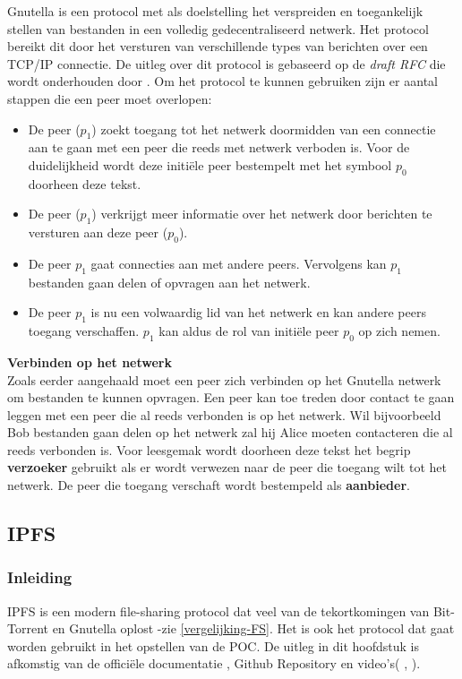 Gnutella is een protocol met als doelstelling het verspreiden en toegankelijk stellen van bestanden in een volledig gedecentraliseerd netwerk. Het protocol bereikt dit door het versturen van verschillende types van berichten over een TCP/IP connectie. De uitleg over dit protocol is gebaseerd op de \textit{draft RFC} die wordt onderhouden door \textcite{Klingberg2002}. Om het protocol te kunnen gebruiken zijn er aantal stappen die een peer moet overlopen:

\begin{itemize}
\item De peer ($p_1$) zoekt toegang tot het netwerk doormidden van een connectie aan te gaan met een peer die reeds met netwerk verboden is. Voor de duidelijkheid wordt deze initiële peer bestempelt met het symbool $p_0$ doorheen deze tekst.\\
\item De peer ($p_1$) verkrijgt meer informatie over het netwerk door berichten te versturen aan deze peer ($p_0$).\\
\item De peer $p_1$ gaat connecties aan met andere peers. Vervolgens kan $p_1$ bestanden gaan delen of opvragen aan het netwerk.\\
\item De peer $p_1$ is nu een volwaardig lid van het netwerk en kan andere peers toegang verschaffen. $p_1$ kan aldus de rol van initiële peer $p_0$ op zich nemen.
\end{itemize}


\textbf{Verbinden op het netwerk}\\

Zoals eerder aangehaald moet een peer zich verbinden op het Gnutella netwerk om bestanden te kunnen opvragen. Een peer kan toe treden door contact te gaan leggen met een peer die al reeds verbonden is op het netwerk. Wil bijvoorbeeld Bob bestanden gaan delen op het netwerk zal hij Alice moeten contacteren die al reeds verbonden is. Voor leesgemak wordt doorheen deze tekst het begrip \textbf{verzoeker} gebruikt als er wordt verwezen naar de peer die toegang wilt tot het netwerk. De peer die toegang verschaft wordt bestempeld als \textbf{aanbieder}.\\


\subsection{IPFS}
\subsubsection{Inleiding}
IPFS is een modern file-sharing protocol dat veel van de tekortkomingen van Bit-Torrent en Gnutella oplost -zie \ref{vergelijking-FS}. Het is ook het protocol dat gaat worden gebruikt in het opstellen van de POC. De uitleg in dit hoofdstuk is afkomstig van de officiële documentatie \autocite{}, Github Repository \autocite{} en video's(\autocite{} , \autocite{}).\\

